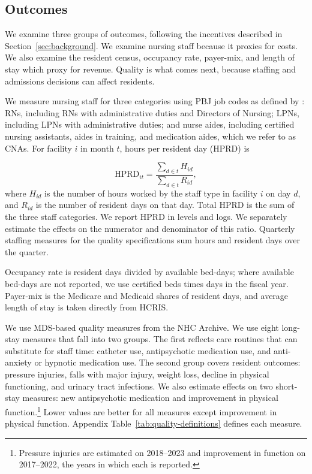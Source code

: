 \documentclass[12pt]{article}
\begin{document}
\subsection{Outcomes}

We examine three groups of outcomes, following the incentives described in Section~\ref{sec:background}. We examine nursing staff because it proxies for costs. We also examine the resident census, occupancy rate, payer-mix, and length of stay which proxy for revenue. Quality is what comes next, because staffing and admissions decisions can affect residents.

We measure nursing staff for three categories using PBJ job codes as defined by \citet{cms_fivestar_2026}: RNs, including RNs with administrative duties and Directors of Nursing; LPNs, including LPNs with administrative duties; and nurse aides, including certified nursing assistants, aides in training, and medication aides, which we refer to as CNAs. For facility \(i\) in month \(t\), hours per resident day (HPRD) is

\begin{equation}
  \label{eq:hprd}
  \text{HPRD}_{it}
  =
  \frac{\displaystyle\sum_{d \in t} H_{id}}
       {\displaystyle\sum_{d \in t} R_{id}},
\end{equation}
where \(H_{id}\) is the number of hours worked by the staff type in facility \(i\) on day \(d\), and \(R_{id}\) is the number of resident days on that day. Total HPRD is the sum of the three staff categories. We report HPRD in levels and logs. We separately estimate the effects on the numerator and denominator of this ratio. Quarterly staffing measures for the quality specifications sum hours and resident days over the quarter.

Occupancy rate is resident days divided by available bed-days; where available bed-days are not reported, we use certified beds times days in the fiscal year. Payer-mix is the Medicare and Medicaid shares of resident days, and average length of stay is taken directly from HCRIS.

We use MDS-based quality measures from the NHC Archive. We use eight long-stay measures that fall into two groups. The first reflects care routines that can substitute for staff time: catheter use, antipsychotic medication use, and anti-anxiety or hypnotic medication use. The second group covers resident outcomes: pressure injuries, falls with major injury, weight loss, decline in physical functioning, and urinary tract infections. We also estimate effects on two short-stay measures: new antipsychotic medication and improvement in physical function.\footnote{Pressure injuries are estimated on 2018–2023 and improvement in function on 2017–2022, the years in which each is reported.} Lower values are better for all measures except improvement in physical function. Appendix Table~\ref{tab:quality-definitions} defines each measure.
\end{document}
